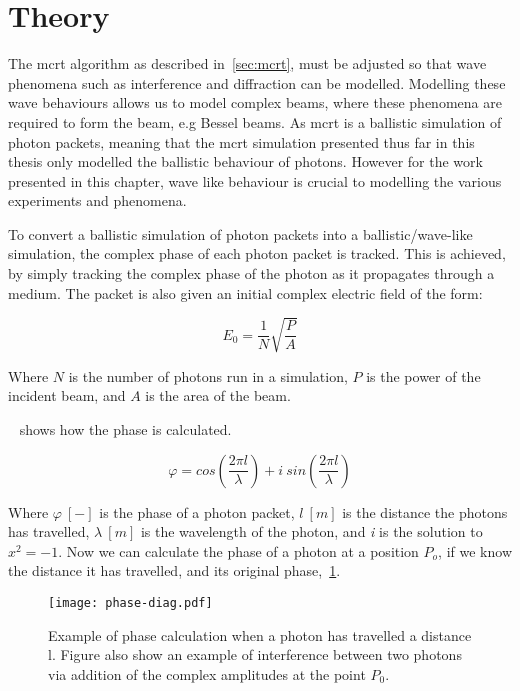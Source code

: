 

\section{Theory}\label{sec:bestheory}

The \gls*{mcrt} algorithm as described in~\cref{sec:mcrt}, must be adjusted so that wave phenomena such as interference and diffraction can be modelled. 
Modelling these wave behaviours allows us to model complex beams, where these phenomena are required to form the beam, e.g Bessel beams. 
As \gls*{mcrt} is a ballistic simulation of photon packets, meaning that the \gls*{mcrt} simulation presented thus far in this thesis only modelled the ballistic behaviour of photons. 
However for the work presented in this chapter, wave like behaviour is crucial to modelling the various experiments and phenomena.

To convert a ballistic simulation of photon packets into a ballistic/wave-like simulation, the complex phase of each photon packet is tracked.
This is achieved, by simply tracking the complex phase of the photon as it propagates through a medium.
The packet is also given an initial complex electric field of the form:

\begin{equation}
E_0 = \frac{1}{N}\sqrt{\frac{P}{A}}
\label{eqn:initefield}
\end{equation}

Where $N$ is the number of photons run in a simulation, $P$ is the power of the incident beam, and $A$ is the area of the beam.

~ shows how the phase is calculated.

\begin{equation}
    \varphi = cos\left(\frac{2 \pi l}{\lambda}\right) + i\ sin\left(\frac{2 \pi l}{\lambda}\right)
    \label{eqn:phase}
\end{equation}

Where $\varphi~[-]$ is the phase of a photon packet, $l\ [m]$ is the distance the photons has travelled, $\lambda~[m]$ is the wavelength of the photon, and \textit{i} is the solution to $x^2=-1$.
Now we can calculate the phase of a photon at a position $P_o$, if we know the distance it has travelled, and its original phase,~\cref{fig:phase-diag}.

\begin{figure}[!ht]
    \centering
    \texttt{[image: phase-diag.pdf]}
    \caption{Example of phase calculation when a photon has travelled a distance l. Figure also show an example of interference between two photons via addition of the complex amplitudes at the point $P_0$.}
    \label{fig:phase-diag}
\end{figure}

